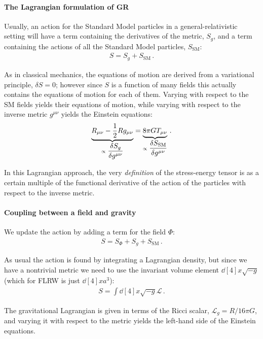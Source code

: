 \documentclass[main.tex]{subfiles}
\begin{document}
\paragraph{The Lagrangian formulation of GR}

Usually, an action for the Standard Model particles in a general-relativistic setting will have a term containing the derivatives of the metric, \(S_g\), and a term containing the actions of all the Standard Model particles, \(S _{\text{SM}}\):
%
\begin{align}
S = S_g + S_{\text{SM}}
\,.
\end{align}

As in classical mechanics, the equations of motion are derived from a variational principle, \(\delta S = 0\); however since \(S\) is a function of many fields this actually contains the equations of motion for each of them. Varying with respect to the SM fields yields their equations of motion, while varying with respect to the inverse metric \(g^{\mu \nu }\) yields the Einstein equations: 
%
\begin{align}
\underbrace{R_{\mu \nu } - \frac{1}{2} R g_{\mu \nu }}_{\propto\displaystyle \fdv{S_g}{g^{\mu \nu }}} 
= \underbrace{8 \pi G T_{\mu \nu }}_{\propto\displaystyle \fdv{S _{\text{SM}}}{g^{\mu \nu }}}
\,.
\end{align}

In this Lagrangian approach, the very \emph{definition} of the stress-energy tensor is as a certain multiple of the functional derivative of the action of the particles with respect to the inverse metric. 

\paragraph{Coupling between a field and gravity}

We update the action by adding a term for the field \(\Phi \):
%
\begin{align}
  S = S_{\Phi } + S_{g} + S_{\text{SM}}
\,.
\end{align}


As usual the action is found by integrating a Lagrangian density, but since we have a nontrivial metric we need to use the invariant volume element \(\dd[4]{x} \sqrt{-g}\) (which for FLRW is just \(\dd[4]{x} a^3\)): 
%
\begin{align}
  S = \int \dd[4]{x} \sqrt{-g} \mathscr{L}
\,.
\end{align}

The gravitational Lagrangian is given in terms of the Ricci scalar, \(\mathscr{L}_g = R /16 \pi G\), and varying it with respect to the metric yields the left-hand side of the Einstein equations.
\end{document}
